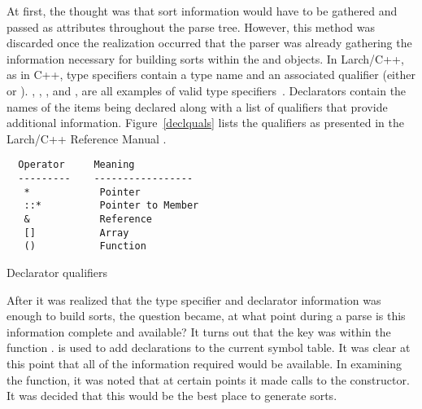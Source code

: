 At first, the thought was that sort information would have to be
gathered and passed as attributes throughout the parse tree. However,
this method was discarded once the realization occurred that the
parser was already gathering the information necessary for building
sorts within the  and  objects. In Larch/C++,
as in C++, type specifiers contain a type name and an associated
qualifier (either  or ). ,
, , and , are all examples of valid type
specifiers~\cite{Leavens96c}. Declarators contain the names of the
items being declared along with a list of qualifiers that provide
additional information. Figure~\ref{declquals} lists the qualifiers as
presented in the Larch/C++ Reference Manual \cite{Leavens96c}.
\begin{BFIGURE}
\begin{verbatim}
  Operator     Meaning
  ---------    -----------------
   *            Pointer
   ::*          Pointer to Member
   &            Reference
   []           Array
   ()           Function
\end{verbatim}
\caption{Declarator qualifiers}
\label{declquals}
\end{BFIGURE}


After it was realized that the type specifier and declarator
information was enough to build sorts, the question became, at what
point during a parse is this information complete and available? It
turns out that the key was within the function
.  is used to add declarations
to the current symbol table. It was clear at this point that all of
the information required would be available. In examining
the  function, it was noted that at certain points
it made calls to the  constructor. It was decided that
this would be the best place to generate sorts. 

